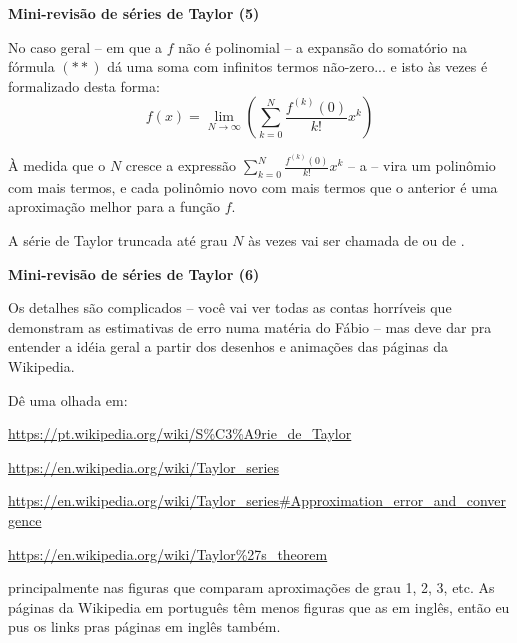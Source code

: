 \documentclass[oneside,12pt]{article}
\begin{document}
\newpage


{\bf Mini-revisão de séries de Taylor (5)}

\ssk

No caso geral -- em que a $f$ não é polinomial -- a expansão do
somatório na fórmula $(**)$ dá uma soma com infinitos termos
não-zero... e isto às vezes é formalizado desta forma:
%
$$f(x) = \displaystyle \lim_{N→∞} \left(\sum_{k=0}^N \frac{f^{(k)}(0)}{k!} x^k\right)$$

À medida que o $N$ cresce a expressão $\sum_{k=0}^N
\frac{f^{(k)}(0)}{k!} x^k$ -- a  -- vira um polinômio com mais termos, e
cada polinômio novo com mais termos que o anterior é uma aproximação
melhor para a função $f$.

\msk

A série de Taylor truncada até grau $N$ às vezes vai ser chamada de
 ou de .



\newpage


{\bf Mini-revisão de séries de Taylor (6)}

\ssk

Os detalhes são  complicados -- você vai ver todas as
contas horríveis que demonstram as estimativas de erro numa matéria do
Fábio -- mas deve dar pra entender a idéia geral a partir dos desenhos
e animações das páginas da Wikipedia.

Dê uma olhada em:

\ssk


\url{https://pt.wikipedia.org/wiki/S\%C3\%A9rie_de_Taylor}

\url{https://en.wikipedia.org/wiki/Taylor_series}

\url{https://en.wikipedia.org/wiki/Taylor_series\#Approximation_error_and_convergence}

\url{https://en.wikipedia.org/wiki/Taylor\%27s_theorem}

\ssk

principalmente nas figuras que comparam aproximações de grau 1, 2, 3,
etc. As páginas da Wikipedia em português têm menos figuras que as em
inglês, então eu pus os links pras páginas em inglês também.
\end{document}
